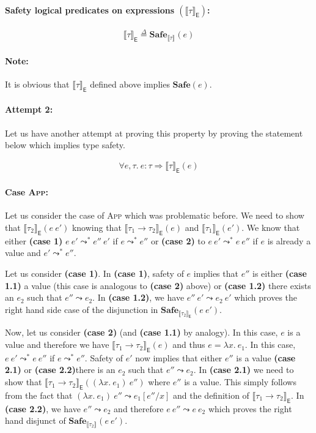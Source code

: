 \documentclass{article}
\newcommand{\EXP}{\mathsf{E}}
\newcommand{\defeq}{\overset{\Delta}{=}}
\newcommand{\semtyp}[2]{\llbracket #2 \rrbracket_{#1}}
\begin{document}
\paragraph{Safety logical predicates on expressions $\left(\semtyp{\EXP}{\tau}\right)$:}
\[
\semtyp{\EXP}{\tau} \defeq \mathbf{Safe}_{\semtyp{}{\tau}}(e)
\]

\paragraph{Note:} It is obvious that $\semtyp{\EXP}{\tau}$
defined above implies $\mathbf{Safe}(e)$.

\paragraph{Attempt 2:} Let us have another attempt at proving this property by proving
the statement below which implies type safety.

\begin{align*}
\label{secatt}
\forall e, \tau.~e : \tau \Rightarrow \semtyp{\EXP}{\tau}(e)
\end{align*}

\paragraph{Case \textsc{App}:}
Let us consider the case of \textsc{App} which was problematic before.
We need to show that $\semtyp{\EXP}{\tau_2}(e~e')$ knowing that
$\semtyp{\EXP}{\tau_1 \to \tau_2}(e)$ and $\semtyp{\EXP}{\tau_1}(e')$.
We know that either \textbf{(case 1)} $e~e' \leadsto^* e''~e'$ if $e \leadsto^* e''$
or \textbf{(case 2)} to $e~e' \leadsto^* e~e''$ if $e$ is already a value and $e' \leadsto^* e''$.

Let us consider \textbf{(case 1)}.
In \textbf{(case 1)}, safety of $e$ implies that $e''$ is either \textbf{(case 1.1)} a value (this case is analogous to \textbf{(case 2)} above) or \textbf{(case 1.2)} there exists an $e_2$ such that $e'' \leadsto e_2$. In \textbf{(case 1.2)}, we have $e''~e' \leadsto e_2~e'$ which proves
the right hand side case of the disjunction in $\mathbf{Safe}_{\semtyp{\EXP}{\tau_2}}(e~e')$.

Now, let us consider \textbf{(case 2)} (and \textbf{(case 1.1)} by analogy). In this case, $e$ is
a value and therefore we have $\semtyp{\EXP}{\tau_1 \to \tau_2}(e)$ and thus $e = \lambda x.~e_1$.
In this case, $e~e' \leadsto^* e~e''$ if $e \leadsto^* e''$. Safety of $e'$ now implies that
either $e''$ is a value \textbf{(case 2.1)} or \textbf{(case 2.2)}there is an $e_2$ such that
$e'' \leadsto e_2$.
In \textbf{(case 2.1)} we need to show that $\semtyp{\EXP}{\tau_1 \to \tau_2}((\lambda x.~e_1)~e'')$ where $e''$ is a value. This simply follows from the fact that $(\lambda x.~e_1)~e'' \leadsto e_1[e''/x]$ and the definition of $\semtyp{\EXP}{\tau_1 \to \tau_2}$.
In \textbf{(case 2.2)}, we have $e'' \leadsto e_2$ and therefore $e~e'' \leadsto e~e_2$ which
proves the right hand disjunct of $\mathbf{Safe}_{\semtyp{}{\tau_2}}(e~e')$.
\end{document}
